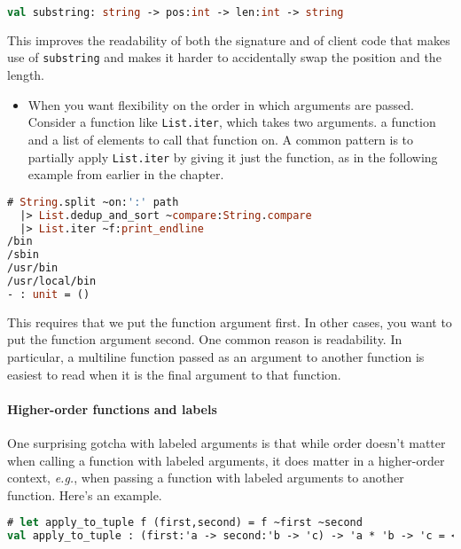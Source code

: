 \begin{lstlisting}[language=Caml]
val substring: string -> pos:int -> len:int -> string
\end{lstlisting}

This improves the readability of both the signature and of client code
that makes use of \passthrough{\lstinline!substring!} and makes it
harder to accidentally swap the position and the length.

\begin{itemize}
\tightlist
\item
  When you want flexibility on the order in which arguments are passed.
  Consider a function like \passthrough{\lstinline!List.iter!}, which
  takes two arguments. a function and a list of elements to call that
  function on. A common pattern is to partially apply
  \passthrough{\lstinline!List.iter!} by giving it just the function, as
  in the following example from earlier in the chapter.
\end{itemize}

\begin{lstlisting}[language=Caml]
# String.split ~on:':' path
  |> List.dedup_and_sort ~compare:String.compare
  |> List.iter ~f:print_endline
/bin
/sbin
/usr/bin
/usr/local/bin
- : unit = ()
\end{lstlisting}

This requires that we put the function argument first. In other cases,
you want to put the function argument second. One common reason is
readability. In particular, a multiline function passed as an argument
to another function is easiest to read when it is the final argument to
that function.

\hypertarget{higher-order-functions-and-labels}{%
\paragraph{Higher-order functions and
labels}\label{higher-order-functions-and-labels}}

One surprising gotcha with labeled arguments is that while order doesn't
matter when calling a function with labeled arguments, it does matter in
a higher-order context, \emph{e.g.}, when passing a function with
labeled arguments to another function. Here's an
example.

\begin{lstlisting}[language=Caml]
# let apply_to_tuple f (first,second) = f ~first ~second
val apply_to_tuple : (first:'a -> second:'b -> 'c) -> 'a * 'b -> 'c = <fun>
\end{lstlisting}

